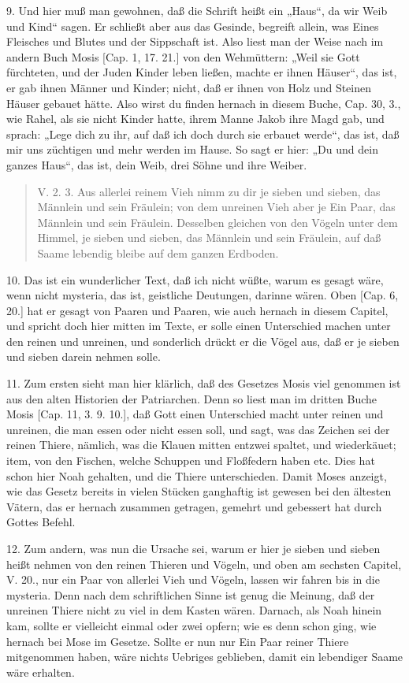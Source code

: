 9. Und hier muß man gewohnen, daß die Schrift heißt ein „Haus“, da wir Weib und Kind“ sagen. Er schließt aber aus das Gesinde, begreift allein, was Eines Fleisches und Blutes und der Sippschaft ist. Also liest man der Weise nach im andern Buch Mosis [Cap. 1, 17. 21.] von den Wehmüttern: „Weil sie Gott fürchteten, und der Juden Kinder leben ließen, machte er ihnen Häuser“, das ist, er gab ihnen Männer und Kinder; nicht, daß er ihnen von Holz und Steinen Häuser gebauet hätte. Also wirst du finden hernach in diesem Buche, Cap. 30, 3., wie Rahel, als sie nicht Kinder hatte, ihrem Manne Jakob ihre Magd gab, und sprach: „Lege dich zu ihr, auf daß ich doch durch sie erbauet werde“, das ist, daß mir uns züchtigen und mehr werden im Hause. So sagt er hier: „Du und dein ganzes Haus“, das ist, dein Weib, drei Söhne und ihre Weiber.

\begin{quote}
V. 2. 3. Aus allerlei reinem Vieh nimm zu dir je sieben und sieben, das Männlein und sein Fräulein; von dem unreinen Vieh aber je Ein Paar, das Männlein und sein Fräulein. Desselben gleichen von den Vögeln unter dem Himmel, je sieben und sieben, das Männlein und sein Fräulein, auf daß Saame lebendig bleibe auf dem ganzen Erdboden.
\end{quote}

10. Das ist ein wunderlicher Text, daß ich nicht wüßte, warum es gesagt wäre, wenn nicht mysteria, das ist, geistliche Deutungen, darinne wären. Oben [Cap. 6, 20.] hat er gesagt von Paaren und Paaren, wie auch hernach in diesem Capitel, und spricht doch hier mitten im Texte, er solle einen Unterschied machen unter den reinen und unreinen, und sonderlich drückt er die Vögel aus, daß er je sieben und sieben darein nehmen solle.

11. Zum ersten sieht man hier klärlich, daß des Gesetzes Mosis viel genommen ist aus den alten Historien der Patriarchen. Denn so liest man im dritten Buche Mosis [Cap. 11, 3. 9. 10.], daß Gott einen Unterschied macht unter reinen und unreinen, die man essen oder nicht essen soll, und sagt, was das Zeichen sei der reinen Thiere, nämlich, was die Klauen mitten entzwei spaltet, und wiederkäuet; item, von den Fischen, welche Schuppen und Floßfedern haben etc. Dies hat schon hier Noah gehalten, und die Thiere unterschieden. Damit Moses anzeigt, wie das Gesetz bereits in vielen Stücken ganghaftig ist gewesen bei den ältesten Vätern, das er hernach zusammen getragen, gemehrt und gebessert hat durch Gottes Befehl.

12. Zum andern, was nun die Ursache sei, warum er hier je sieben und sieben heißt nehmen von den reinen Thieren und Vögeln, und oben am sechsten Capitel, V. 20., nur ein Paar von allerlei Vieh und Vögeln, lassen wir fahren bis in die mysteria. Denn nach dem schriftlichen Sinne ist genug die Meinung, daß der unreinen Thiere nicht zu viel in dem Kasten wären. Darnach, als Noah hinein kam, sollte er vielleicht einmal oder zwei opfern; wie es denn schon ging, wie hernach bei Mose im Gesetze. Sollte er nun nur Ein Paar reiner Thiere mitgenommen haben, wäre nichts Uebriges geblieben, damit ein lebendiger Saame wäre erhalten.

